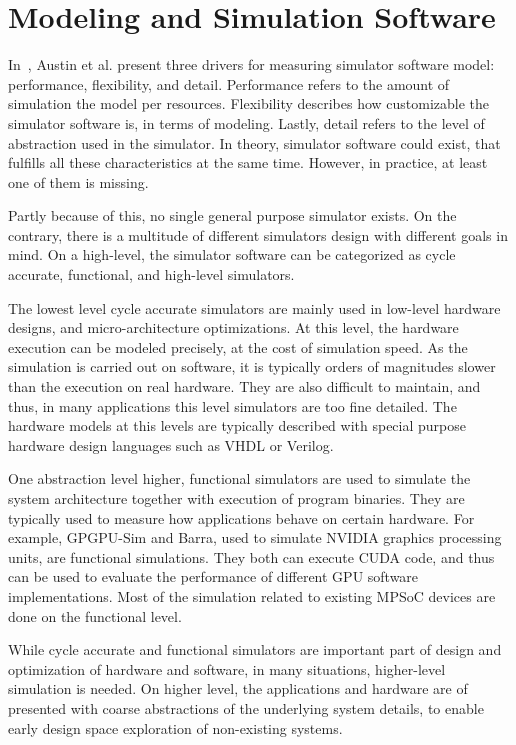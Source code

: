 \section{Modeling and Simulation Software}

In~\cite{Austin:2002:SimpleScalar}, Austin et al. present three drivers for measuring simulator software model: performance, flexibility, and detail. Performance refers to the amount of simulation the model per resources. Flexibility describes how customizable the simulator software is, in terms of modeling. Lastly, detail refers to the level of abstraction used in the simulator. In theory, simulator software could exist, that fulfills all these characteristics at the same time. However, in practice, at least one of them is missing.~\cite{Austin:2002:SimpleScalar}

Partly because of this, no single general purpose simulator exists. On the contrary, there is a multitude of different simulators design with different goals in mind. On a high-level, the simulator software can be categorized as cycle accurate, functional, and high-level simulators.

The lowest level cycle accurate simulators are mainly used in low-level hardware designs, and micro-architecture optimizations. At this level, the hardware execution can be modeled precisely, at the cost of simulation speed. As the simulation is carried out on software, it is typically orders of magnitudes slower than the execution on real hardware. They are also difficult to maintain, and thus, in many applications this level simulators are too fine detailed. The hardware models at this levels are typically described with special purpose hardware design languages such as VHDL or Verilog.~\cite{Patterson:2007:Computer, Weaver:2008:Cycle}

One abstraction level higher, functional simulators are used to simulate the system architecture together with execution of program binaries. They are typically used to measure how applications behave on certain hardware. For example, GPGPU-Sim and Barra, used to simulate NVIDIA graphics processing units, are functional simulations. They both can execute CUDA code, and thus can be used to evaluate the performance of different GPU software implementations. Most of the simulation related to existing MPSoC devices are done on the functional level.~\cite{Lopez:2015:GPGPUSIM}

While cycle accurate and functional simulators are important part of design and optimization of hardware and software, in many situations, higher-level simulation is needed. On higher level, the applications and hardware are of presented with coarse abstractions of the underlying system details, to enable early design space exploration of non-existing systems.

